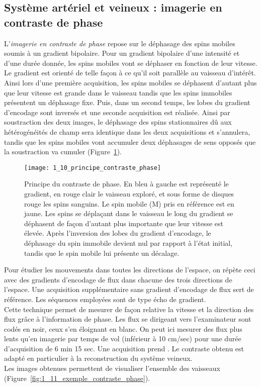 \subsection{Système artériel et veineux : imagerie en contraste de phase}
L’{\em imagerie en contraste de phase} repose sur le déphasage des spins mobiles soumis à un gradient bipolaire. Pour un gradient bipolaire d’une intensité et d’une durée donnée, les spins mobiles vont se déphaser en fonction de leur vitesse.\\
Le gradient est orienté de telle façon à ce qu’il soit parallèle au vaisseau d’intérêt. Ainsi lors d’une première acquisition, les spins mobiles se déphasent d’autant plus que leur vitesse est grande dans le vaisseau tandis que les spins immobiles présentent un déphasage fixe. Puis, dans un second temps, les lobes du gradient d’encodage sont inversés et une seconde acquisition est réalisée. Ainsi par soustraction des deux images, le déphasage des spins stationnaires dû aux hétérogénéités de champ sera identique dans les deux acquisitions et s’annulera, tandis que les spins mobiles vont accumuler deux déphasages de sens opposés que la soustraction va cumuler (Figure~\ref{fig:1_10_principe_contraste_phase}).\\
\begin{figure}[!t]
\centering
\texttt{[image: 1\_10\_principe\_contraste\_phase]}
\caption{Principe du contraste de phase. En bleu à gauche est représenté le gradient, en rouge clair le vaisseau exploré, et sous forme de disques rouge les spins sanguins. Le spin mobile (M) pris en référence est en jaune. Les spins se déplaçant dans le vaisseau le long du gradient se déphasent de façon d’autant plus importante que leur vitesse est élevée. Après l’inversion des lobes du gradient d’encodage, le déphasage du spin immobile devient nul par rapport à l’état initial, tandis que le spin mobile lui présente un décalage. }
\label{fig:1_10_principe_contraste_phase}	
\end{figure}
Pour étudier les mouvements dans toutes les directions de l’espace, on répète ceci avec des gradients d’encodage de flux dans chacune des trois directions de l’espace. Une acquisition supplémentaire sans gradient d’encodage de flux sert de référence. Les séquences employées sont de type écho de gradient.\\
Cette technique permet de mesurer de façon relative la vitesse et la direction des flux grâce à l’information de phase. Les flux se dirigeant vers l’examinateur sont codés en noir, ceux s’en éloignant en blanc. On peut ici mesurer des flux plus lents qu’en imagerie par temps de vol (inférieur à 10 cm/sec) pour une durée d'acquisition de 6 min 15 sec. Une acquisition prend . Le contraste obtenu est adapté en particulier à la reconstruction du système veineux.\\
Les images obtenues permettent de visualiser l’ensemble des vaisseaux (Figure~\ref{fig:1_11_exemple_contraste_phase}).


